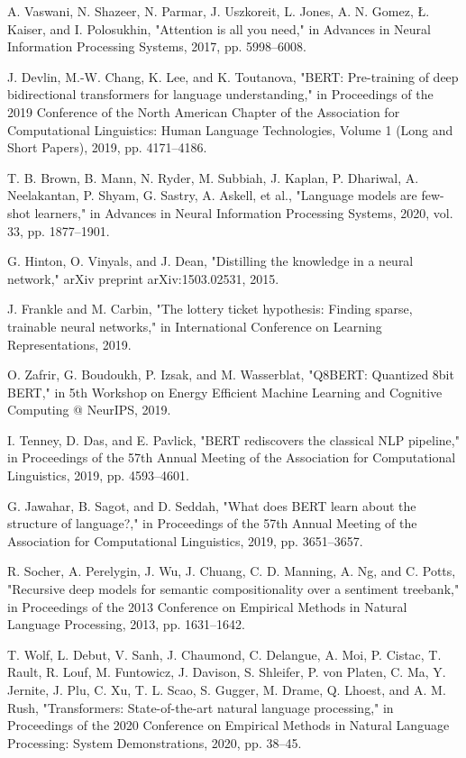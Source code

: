 \documentclass[conference]{IEEEtran}
\begin{document}
\begin{thebibliography}{00}
 A. Vaswani, N. Shazeer, N. Parmar, J. Uszkoreit, L. Jones, A. N. Gomez, Ł. Kaiser, and I. Polosukhin, "Attention is all you need," in Advances in Neural Information Processing Systems, 2017, pp. 5998–6008.

 J. Devlin, M.-W. Chang, K. Lee, and K. Toutanova, "BERT: Pre-training of deep bidirectional transformers for language understanding," in Proceedings of the 2019 Conference of the North American Chapter of the Association for Computational Linguistics: Human Language Technologies, Volume 1 (Long and Short Papers), 2019, pp. 4171–4186.

 T. B. Brown, B. Mann, N. Ryder, M. Subbiah, J. Kaplan, P. Dhariwal, A. Neelakantan, P. Shyam, G. Sastry, A. Askell, et al., "Language models are few-shot learners," in Advances in Neural Information Processing Systems, 2020, vol. 33, pp. 1877–1901.

 G. Hinton, O. Vinyals, and J. Dean, "Distilling the knowledge in a neural network," arXiv preprint arXiv:1503.02531, 2015.

 J. Frankle and M. Carbin, "The lottery ticket hypothesis: Finding sparse, trainable neural networks," in International Conference on Learning Representations, 2019.

 O. Zafrir, G. Boudoukh, P. Izsak, and M. Wasserblat, "Q8BERT: Quantized 8bit BERT," in 5th Workshop on Energy Efficient Machine Learning and Cognitive Computing @ NeurIPS, 2019.

 I. Tenney, D. Das, and E. Pavlick, "BERT rediscovers the classical NLP pipeline," in Proceedings of the 57th Annual Meeting of the Association for Computational Linguistics, 2019, pp. 4593–4601.

 G. Jawahar, B. Sagot, and D. Seddah, "What does BERT learn about the structure of language?," in Proceedings of the 57th Annual Meeting of the Association for Computational Linguistics, 2019, pp. 3651–3657.

 R. Socher, A. Perelygin, J. Wu, J. Chuang, C. D. Manning, A. Ng, and C. Potts, "Recursive deep models for semantic compositionality over a sentiment treebank," in Proceedings of the 2013 Conference on Empirical Methods in Natural Language Processing, 2013, pp. 1631–1642.

 T. Wolf, L. Debut, V. Sanh, J. Chaumond, C. Delangue, A. Moi, P. Cistac, T. Rault, R. Louf, M. Funtowicz, J. Davison, S. Shleifer, P. von Platen, C. Ma, Y. Jernite, J. Plu, C. Xu, T. L. Scao, S. Gugger, M. Drame, Q. Lhoest, and A. M. Rush, "Transformers: State-of-the-art natural language processing," in Proceedings of the 2020 Conference on Empirical Methods in Natural Language Processing: System Demonstrations, 2020, pp. 38–45.
\end{thebibliography}
\end{document}
